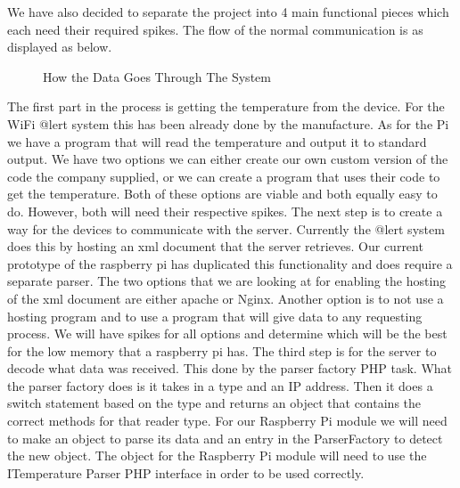 \documentclass{report}
\begin{document}
We have also decided to separate the project into 4 main functional pieces which each need their required spikes. The flow of the normal communication is as displayed as below.
\begin{figure}[H]
\caption{How the Data Goes Through The System}
\end{figure}
The first part in the process is getting the temperature from the device. 
For the WiFi @lert system this has been already done by the manufacture. 
As for the Pi we have a program that will read the temperature and output it to standard output.
We have two options we can either create our own custom version of the code the company supplied, or we can create a program that uses their code to get the temperature.
Both of these options are viable and both equally easy to do. 
However, both will need their respective spikes.
\newline
\indent
The next step is to create a way for the devices to communicate with the server.
Currently the @lert system does this by hosting an xml document that the server retrieves.
Our current prototype of the raspberry pi has duplicated this functionality and does require a separate parser.
The two options that we are looking at for enabling the hosting of the xml document are either apache or Nginx.
Another option is to not use a hosting program and to use a program that will give data to any requesting process.
We will have spikes for all options and determine which will be the best for the low memory that a raspberry pi has.
\newline
\indent
The third step is for the server to decode what data was received. 
This done by the parser factory PHP task.
What the parser factory does is it takes in a type and an IP address.
Then it does a switch statement based on the type and returns an object that contains the correct methods for that reader type.
For our Raspberry Pi module we will need to make an object to parse its data and an entry in the ParserFactory to detect the new object.
The object for the Raspberry Pi module will need to use the ITemperature Parser PHP interface in order to be used correctly.
\end{document}
